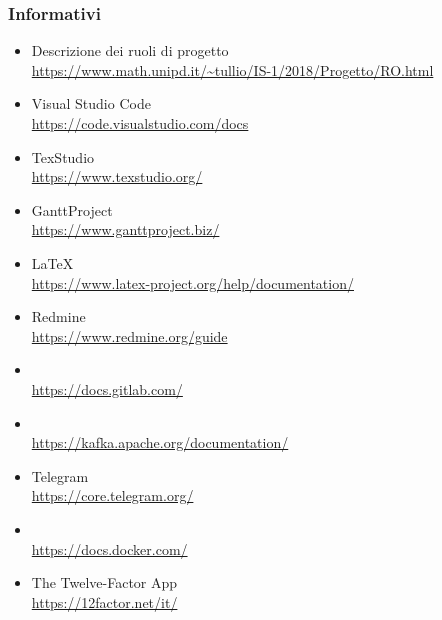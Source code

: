     \subsubsection{Informativi}	\label{rifinfo}
    \begin{itemize}
        \item Descrizione dei ruoli di progetto \\\url{https://www.math.unipd.it/~tullio/IS-1/2018/Progetto/RO.html}
        \item Visual Studio Code \\\url{https://code.visualstudio.com/docs}
        \item TexStudio \\\url{https://www.texstudio.org/}
        \item GanttProject \\\url{https://www.ganttproject.biz/}
		\item \LaTeX\ \\\url{https://www.latex-project.org/help/documentation/}
		\item Redmine \\\url{https://www.redmine.org/guide}
		\item {} \\\url{https://docs.gitlab.com/}
		\item {} \\\url{https://kafka.apache.org/documentation/}
		\item Telegram \\\url{https://core.telegram.org/}
		\item {} \\\url{https://docs.docker.com/}
		\item The Twelve-Factor App \\\url{https://12factor.net/it/}
	\end{itemize}
